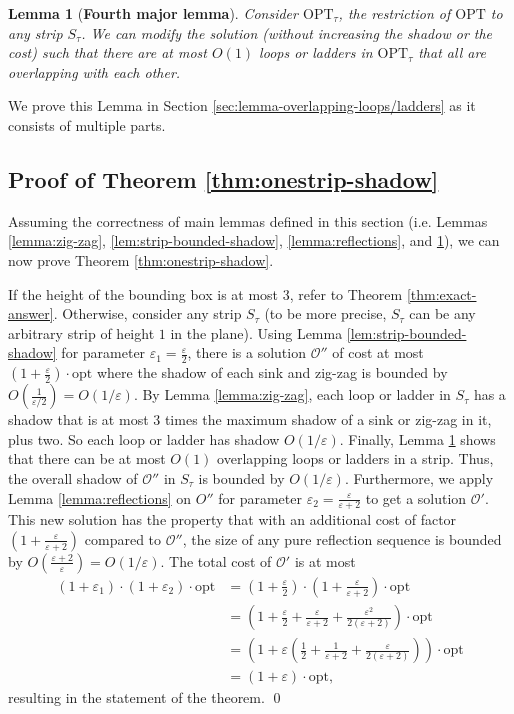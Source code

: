 \documentclass[10pt,a4paper]{amsart}
\theoremstyle{thmstyleone}
\newtheorem{lemma}{Lemma}
\newcommand{\eps}{\varepsilon}
\newcommand{\opt}{{\text{opt}}}
\newcommand{\OPT}{{\text{OPT}}}
\begin{document}
\begin{lemma}[\bf Fourth major lemma]\label{lemma:overlapping-loops-ladders}
    Consider $\OPT_\tau$, the restriction of $\OPT$ to any strip $S_\tau$. We can modify the solution (without increasing the shadow or the cost) such that
    there are at most $O(1)$ loops or ladders in $ \OPT_\tau $ that all are overlapping with each other. 
\end{lemma}
We prove this Lemma in Section \ref{sec:lemma-overlapping-loops/ladders} as it consists of multiple parts.


\subsection{Proof of Theorem \ref{thm:onestrip-shadow}}
\label{sec:thm-onestrip-shadow}
Assuming the correctness of main lemmas defined in this section (i.e. Lemmas \ref{lemma:zig-zag}, \ref{lem:strip-bounded-shadow}, \ref{lemma:reflections}, and \ref{lemma:overlapping-loops-ladders}), we can now prove Theorem \ref{thm:onestrip-shadow}.

If the height of the bounding box is at most 3, refer to Theorem \ref{thm:exact-answer}.
Otherwise, consider any strip $S_\tau$ (to be more precise, $S_\tau$ can be any arbitrary strip of height $1$ in the plane).
Using Lemma \ref{lem:strip-bounded-shadow} for parameter $ \eps_1 = \frac\eps2 $, there is a solution $\mathcal O''$ of cost at most $(1+\frac\eps2)\cdot\opt$
where the shadow of each sink and zig-zag is bounded by $O(\frac1{\eps/2}) = O(1/\eps)$.
By Lemma \ref{lemma:zig-zag}, each loop or ladder in $S_\tau$ has a shadow that is at most 3 times the maximum  shadow of a sink or zig-zag in it, plus two. So each loop or ladder has shadow $O(1/\eps)$.
Finally, Lemma \ref{lemma:overlapping-loops-ladders} shows that there can be at most $O(1)$ overlapping loops or
ladders in a strip. Thus, the overall shadow of $\mathcal O''$ in $S_\tau$ is bounded by $O(1/\eps)$.
Furthermore, we apply Lemma \ref{lemma:reflections} on $ O'' $ for parameter $ \eps_2 = \frac\eps{\eps + 2} $ to get a solution $ \mathcal O' $. This new solution has the property that with an additional cost of factor $ (1 + \frac\eps{\eps+ 2}) $ compared to $ \mathcal O'' $, the size of any pure
reflection sequence is bounded by $O(\frac{\eps + 2}{\eps}) = O(1/\eps)$. The total cost of $ \mathcal O' $ is at most 
\begin{align*}
    (1 + \eps_1)\cdot (1+\eps_2)\cdot \opt &= (1 + \tfrac\eps2) \cdot (1 + \tfrac\eps{\eps + 2})\cdot \opt\\
    &= (1 + \tfrac\eps2 + \tfrac\eps{\eps + 2} + \tfrac{\eps^2}{2(\eps + 2)})\cdot\opt\\
    &= (1 + \eps (\tfrac12 + \tfrac1{\eps + 2} + \tfrac\eps{2(\eps + 2)}))\cdot \opt\\
    &= (1 + \eps)\cdot \opt,
\end{align*}
resulting in the statement of the theorem. \qed
\end{document}
